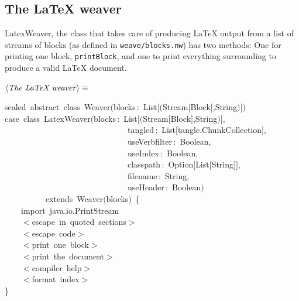 \documentclass[a4paper,12pt]{article}
\begin{document}
\subsection{The LaTeX weaver}
LatexWeaver, the class that takes care of producing LaTeX output from a list of
streams of blocks (as defined in \texttt{weave/blocks.nw}) has two methods: One for
printing one block, \texttt{printBlock}, and one to print everything surrounding
to produce a valid LaTeX document.

$\left<\mbox{\emph{The LaTeX weaver}}\right>\equiv$
\begin{program}{\vem sealed}~{\vem abstract}~{\vem class}~Weaver$($blocks\,{\rm :}~List$[$$($Stream$[$Block$]$,String$)$$]$$)$
\\[0.5em]{\vem case}~{\vem class}~LatexWeaver$($blocks\,{\rm :}~List$[$$($Stream$[$Block$]$,String$)$$]$,
\\~~~~~~~~~~~~~~~~~~~~~~~~~~~~~~tangled\,{\rm :}~List$[$tangle.ChunkCollection$]$,
\\~~~~~~~~~~~~~~~~~~~~~~~~~~~~~~useVerbfilter\,{\rm :}~Boolean,
\\~~~~~~~~~~~~~~~~~~~~~~~~~~~~~~useIndex\,{\rm :}~Boolean,
\\~~~~~~~~~~~~~~~~~~~~~~~~~~~~~~classpath\,{\rm :}~Option$[$List$[$String$]$$]$,
\\~~~~~~~~~~~~~~~~~~~~~~~~~~~~~~filename\,{\rm :}~String,
\\~~~~~~~~~~~~~~~~~~~~~~~~~~~~~~useHeader\,{\rm :}~Boolean$)$
\\~~~~~~~~~~{\vem extends}~Weaver$($blocks$)$~{\small\{}
\\[0.5em]~~~~{\vem import}~java.io.PrintStream
\\[0.5em]~~~~$<$escape~in~quoted~sections$>$
\\[0.5em]~~~~$<$escape~code$>$
\\[0.5em]~~~~$<$print~one~block$>$
\\[0.5em]~~~~$<$print~the~document$>$
\\[0.5em]~~~~$<$compiler~help$>$
\\[0.5em]~~~~$<$format~index$>$
\\{\small\}}
\\[0.5em]\end{program}
\end{document}
